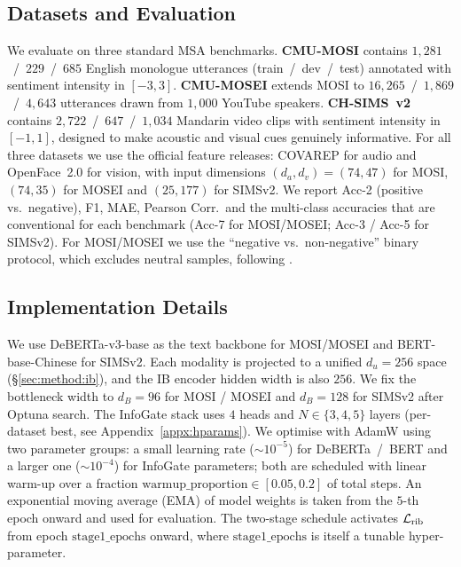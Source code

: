 \subsection{Datasets and Evaluation}
\label{sec:exp:setup}

We evaluate \methodname{} on three standard MSA benchmarks.
\textbf{CMU-MOSI} \citep{zadeh2016mosi} contains $1{,}281$~/~$229$~/~$685$
English monologue utterances (train~/~dev~/~test) annotated with
sentiment intensity in $[-3,3]$.
\textbf{CMU-MOSEI} \citep{zadeh2018mosei} extends MOSI to $16{,}265$~/~$1{,}869$~/~$4{,}643$
utterances drawn from $1{,}000$ YouTube speakers.
\textbf{CH-SIMS~v2} \citep{liu2022simsv2} contains $2{,}722$~/~$647$~/~$1{,}034$
Mandarin video clips with sentiment intensity in $[-1,1]$, designed to
make acoustic and visual cues genuinely informative.
For all three datasets we use the official feature releases: COVAREP
\citep{degottex2014covarep} for audio and OpenFace~2.0
\citep{baltrusaitis2018openface} for vision, with input dimensions
$(d_{a},d_{v})=(74,47)$ for MOSI, $(74,35)$ for MOSEI and $(25,177)$ for
SIMSv2.
We report Acc-2 (positive vs.\ negative), F1, MAE, Pearson Corr.\ and
the multi-class accuracies that are conventional for each benchmark
(Acc-7 for MOSI/MOSEI; Acc-3 / Acc-5 for SIMSv2).
For MOSI/MOSEI we use the ``negative vs.\ non-negative''
binary protocol, which excludes neutral samples, following
\citet{tsai2019mult,yu2021selfmm}.

\subsection{Implementation Details}
\label{sec:exp:impl}

We use DeBERTa-v3-base \citep{he2023debertav3} as the text backbone for
MOSI/MOSEI and BERT-base-Chinese \citep{devlin2019bert} for SIMSv2.
Each modality is projected to a unified $d_{u}\!=\!256$ space
(\S\ref{sec:method:ib}), and the IB encoder hidden width is also $256$.
We fix the bottleneck width to $d_{B}\!=\!96$ for MOSI / MOSEI and
$d_{B}\!=\!128$ for SIMSv2 after Optuna search.
The InfoGate stack uses $4$ heads and $N\!\in\!\{3,4,5\}$ layers
(per-dataset best, see Appendix~\ref{appx:hparams}).
We optimise with AdamW \citep{loshchilov2019adamw} using two parameter
groups: a small learning rate ($\sim\!10^{-5}$) for DeBERTa~/~BERT and a
larger one ($\sim\!10^{-4}$) for InfoGate parameters; both are scheduled
with linear warm-up over a fraction
$\mathrm{warmup\_proportion}\in[0.05,0.2]$ of total steps.
An exponential moving average (EMA) of model weights is taken from the
$5$-th epoch onward and used for evaluation.
The two-stage schedule activates $\mathcal{L}_{\text{rib}}$ from epoch
$\mathrm{stage1\_epochs}$ onward, where $\mathrm{stage1\_epochs}$ is
itself a tunable hyper-parameter.

